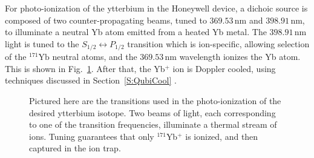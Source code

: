 \documentclass[12pt,a4paper]{amsart}
\numberwithin{equation}{section}
\theoremstyle{plain}
\theoremstyle{definition}
\begin{document}
For photo-ionization of the ytterbium in the Honeywell device, a dichoic source is composed of two counter-propagating beams, tuned to $369.53\,$nm and $398.91\,$nm, to illuminate a neutral Yb atom emitted from a heated Yb metal. The $398.91\,$nm light is tuned to the $S_{1/2}\leftrightarrow P_{1/2}$ transition which is ion-specific, allowing selection of the ${}^{171}\mathrm{Yb}$ neutral atoms, and the $369.53\,$nm wavelength ionizes the Yb atom. This is shown in Fig.~\ref{fig:YbPhoto1}. After that, the Yb$^+$ ion is Doppler cooled, using techniques discussed in Section~\ref{S:QubiCool} \cite{rareEartQubi}\cite{ioniYtteLoad}.

\begin{figure}
\centering
{}
    \caption{Pictured here are the transitions used in the photo-ionization of the desired ytterbium isotope. Two beams of light, each corresponding to one of the transition frequencies, illuminate a thermal stream of ions. Tuning guarantees that only ${}^{171}$Yb$^+$ is ionized, and then captured in the ion trap.}
\label{fig:YbPhoto1}
\end{figure}
\end{document}
